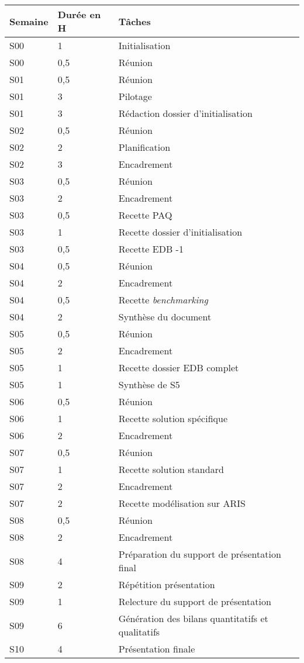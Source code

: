 \begin{longtable}{|l|l|l|}
\hline
Semaine&Durée en H&Tâches\\
\endhead \hline
S00&1&Initialisation\\
\hline
S00&0,5&Réunion\\
\hline
S01&0,5&Réunion\\
\hline
S01&3&Pilotage\\
\hline
S01&3&Rédaction dossier d'initialisation\\
\hline
S02&0,5&Réunion\\
\hline
S02&2&Planification\\
\hline
S02&3&Encadrement\\
\hline
S03&0,5&Réunion\\
\hline
S03&2&Encadrement\\
\hline
S03&0,5&Recette PAQ\\
\hline
S03&1&Recette dossier d'initialisation\\
\hline
S03&0,5&Recette EDB -1\\
\hline
S04&0,5&Réunion\\
\hline
S04&2&Encadrement\\
\hline
S04&0,5&Recette \textsl{benchmarking}\\
\hline
S04&2&Synthèse du document\\
\hline
S05&0,5&Réunion\\
\hline
S05&2&Encadrement\\
\hline
S05&1&Recette dossier EDB complet\\
\hline
S05&1&Synthèse de S5\\
\hline
S06&0,5&Réunion\\
\hline
S06&1&Recette solution spécifique\\
\hline
S06&2&Encadrement\\
\hline
S07&0,5&Réunion\\
\hline
S07&1&Recette solution standard\\
\hline
S07&2&Encadrement\\
\hline
S07&2&Recette modélisation sur ARIS\\
\hline
S08&0,5&Réunion\\
\hline
S08&2&Encadrement\\
\hline
S08&4&Préparation du support de présentation final\\
\hline
S09&2&Répétition présentation\\
\hline
S09&1&Relecture du support de présentation\\
\hline
S09&6&Génération des bilans quantitatifs et qualitatifs\\
\hline
S10&4&Présentation finale\\
\hline
\end{longtable}

